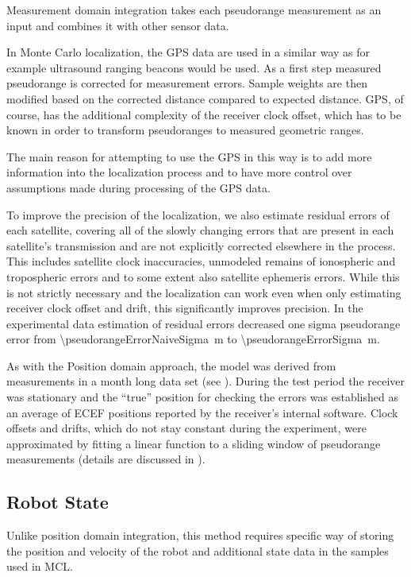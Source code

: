 Measurement domain integration takes each pseudorange measurement as an input
and combines it with other sensor data.

In Monte Carlo localization, the GPS data are used in a similar way as
for example ultrasound ranging beacons would be used.
As a first step measured pseudorange is corrected for measurement errors.
Sample weights are then modified based on the corrected distance compared to expected distance.
GPS, of course, has the additional complexity of the receiver clock offset, which
has to be known in order to transform pseudoranges to measured geometric ranges.

The main reason for attempting to use the GPS in this way is to add more information
into the localization process and to have more control over assumptions made during
processing of the GPS data.

To improve the precision of the localization, we also estimate residual errors of each satellite,
covering all of the slowly changing errors that are present
in each satellite's transmission and are not explicitly corrected elsewhere in the process.
This includes satellite clock inaccuracies, unmodeled remains of ionospheric and
tropospheric errors and to some extent also satellite ephemeris errors.
While this is not strictly necessary and the localization can work even when only
estimating receiver clock offset and drift, this significantly improves precision.
In the experimental data estimation of residual errors decreased one sigma pseudorange error
from \SI{\pseudorangeErrorNaiveSigma}{\meter} to \SI{\pseudorangeErrorSigma}{\meter}.

As with the Position domain approach, the model was derived from
measurements in a month long data set (see ).
During the test period the receiver was stationary and
the \enquote{true} position for checking the errors was established as an average of ECEF
positions reported by the receiver's internal software.
Clock offsets and drifts, which do not stay constant during the experiment,
were approximated by fitting a linear function to a sliding window of pseudorange
measurements (details are discussed in ).

\subsection{Robot State}
Unlike position domain integration, this method requires specific
way of storing the position and velocity of the robot and
additional state data in the samples used in MCL.

